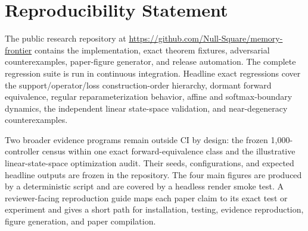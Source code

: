 \section*{Reproducibility Statement}

The public research repository at
\url{https://github.com/Null-Square/memory-frontier}
contains the implementation, exact theorem fixtures, adversarial counterexamples,
paper-figure generator, and release automation. The complete regression suite is
run in continuous integration. Headline exact regressions cover the
support/operator/loss construction-order hierarchy, dormant forward equivalence,
regular reparameterization behavior, affine and softmax-boundary dynamics, the
independent linear state-space validation, and near-degeneracy counterexamples.

Two broader evidence programs remain outside CI by design: the frozen
1,000-controller census within one exact forward-equivalence class and the
illustrative linear-state-space optimization audit. Their seeds, configurations,
and expected headline outputs are frozen in the repository. The four main figures
are produced by a deterministic script and are covered by a headless render smoke
test. A reviewer-facing reproduction guide maps each paper claim to its exact test
or experiment and gives a short path for installation, testing, evidence
reproduction, figure generation, and paper compilation.
